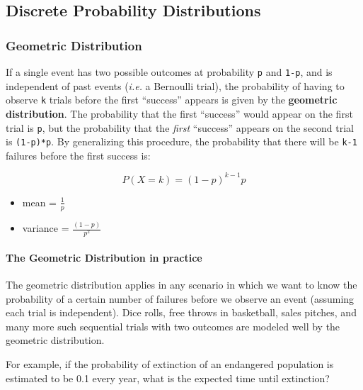 \documentclass[
]{book}
\providecommand{\tightlist}{%
  \setlength{\itemsep}{0pt}\setlength{\parskip}{0pt}}
\begin{document}
\hypertarget{discrete-probability-distributions}{%
\subsection{Discrete Probability Distributions}\label{discrete-probability-distributions}}

\hypertarget{geometric-distribution}{%
\subsubsection{\texorpdfstring{\textbf{Geometric Distribution}}{Geometric Distribution}}\label{geometric-distribution}}

If a single event has two possible outcomes at probability \texttt{p} and \texttt{1-p}, and is independent of past events (\emph{i.e.} a Bernoulli trial), the probability of having to observe \texttt{k} trials before the first ``success'' appears is given by the \textbf{geometric distribution}. The probability that the first ``success'' would appear on the first trial is \texttt{p}, but the probability that the \emph{first} ``success'' appears on the second trial is \texttt{(1-p)*p}. By generalizing this procedure, the probability that there will be \texttt{k-1} failures before the first success is:

\[P(X=k)=(1-p)^{k-1}p\]

\begin{itemize}
\tightlist
\item
  mean = \(\frac{1}{p}\)
\item
  variance = \(\frac{(1-p)}{p^2}\)
\end{itemize}

\hypertarget{the-geometric-distribution-in-practice}{%
\paragraph{\texorpdfstring{The \textbf{Geometric Distribution} in practice}{The Geometric Distribution in practice}}\label{the-geometric-distribution-in-practice}}

The geometric distribution applies in any scenario in which we want to know the probability of a certain number of failures before we observe an event (assuming each trial is independent). Dice rolls, free throws in basketball, sales pitches, and many more such sequential trials with two outcomes are modeled well by the geometric distribution.

For example, if the probability of extinction of an endangered population is estimated to be 0.1 every year, what is the expected time until extinction?
\end{document}
